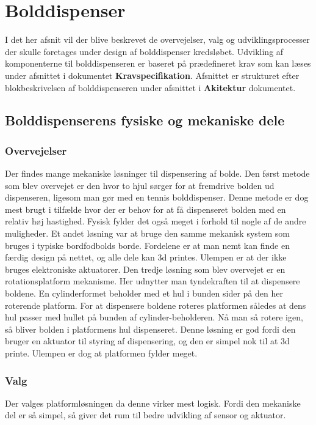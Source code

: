 \documentclass[HardwareDesign/HardwareDesign_main.tex]{subfiles}
\begin{document}
\section{Bolddispenser}
I det her afsnit vil der blive beskrevet de overvejelser, valg og udviklingsprocesser der skulle foretages under design af bolddispenser kredsløbet. Udvikling af komponenterne til bolddispenseren er baseret på prædefineret krav som kan læses under afsnittet  i dokumentet \textbf{Kravspecifikation}. Afsnittet er strukturet efter blokbeskrivelsen af bolddispenseren under afsnittet  i \textbf{Akitektur} dokumentet.

\subsection{Bolddispenserens fysiske og mekaniske dele}
\subsubsection{Overvejelser}
Der findes mange mekaniske løsninger til dispensering af bolde. Den først metode som blev overvejet er den hvor to hjul sørger for at fremdrive bolden ud dispenseren, ligesom man gør med en tennis bolddispenser. Denne metode er dog mest brugt i tilfælde hvor der er behov for at få dispenseret bolden med en relativ høj hastighed. Fysisk fylder det også meget i forhold til nogle af de andre muligheder. Et andet løsning var at bruge den samme mekanisk system som bruges i typiske bordfodbolds borde. Fordelene er at man nemt kan finde en færdig design på nettet, og alle dele kan 3d printes. Ulempen er at der ikke bruges elektroniske aktuatorer.
Den tredje løsning som blev overvejet er en rotationsplatform mekanisme. Her udnytter man tyndekraften til at dispensere boldene. En cylinderformet beholder med et hul i bunden sider på den her roterende platform. For at dispensere boldene roteres platformen således at dens hul passer med hullet på bunden af cylinder-beholderen. Nå man så rotere igen, så bliver bolden i platformens hul dispenseret. Denne løsning er god fordi den bruger en aktuator til styring af dispensering, og den er simpel nok til at 3d printe. Ulempen er dog at platformen fylder meget.

\subsubsection{Valg}
Der valges platformløsningen da denne virker mest logisk. Fordi den mekaniske del er så simpel, så giver det rum til bedre udvikling af sensor og aktuator.
\end{document}
